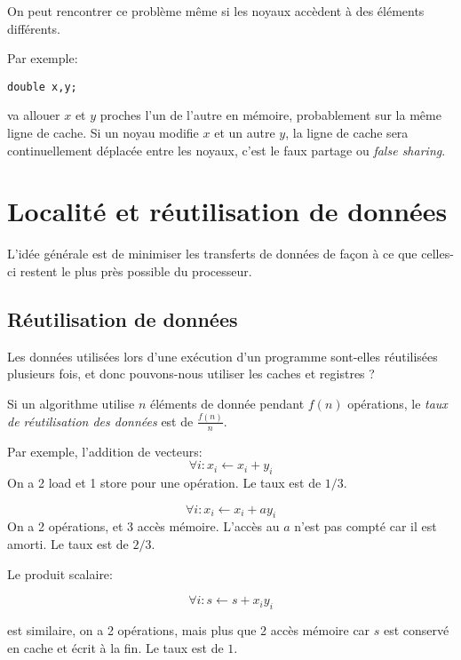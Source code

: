 On peut rencontrer ce problème même si les noyaux accèdent à des éléments différents.

Par exemple:
\begin{verbatim}
double x,y;
\end{verbatim}
va allouer $x$ et $y$ proches l'un de l'autre en mémoire, probablement sur la même ligne de cache. Si un noyau modifie $x$ et un autre $y$, la ligne de cache sera continuellement déplacée entre les noyaux, c'est le faux partage ou \textit{false sharing}.
	
\section{Localité et réutilisation de données}

L'idée générale est de minimiser les transferts de données de façon à ce que celles-ci restent le plus près possible du processeur.

	\subsection{Réutilisation de données}
	
Les données utilisées lors d'une exécution d'un programme sont-elles réutilisées plusieurs fois, et donc pouvons-nous utiliser les caches et registres ? 

Si un algorithme utilise $n$ éléments de donnée pendant $f(n)$ opérations, le \textit{taux de réutilisation des données} est de $\frac{f(n)}{n}$.

Par exemple, l'addition de vecteurs:
\begin{equation}
\forall i : x_i \leftarrow x_i + y_i
\end{equation}
On a 2 load et 1 store pour une opération. Le taux est de $1/3$.

\begin{equation}
\forall i : x_i \leftarrow x_i + a y_i
\end{equation}
On a 2 opérations, et 3 accès mémoire. L'accès au $a$ n'est pas compté car il est amorti. Le taux est de $2/3$.

Le produit scalaire:

\begin{equation}
\forall i : s \leftarrow s + x_i y_i
\end{equation}

est similaire, on a 2 opérations, mais plus que 2 accès mémoire car $s$ est conservé en cache et écrit à la fin. Le taux est de $1$.


